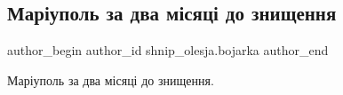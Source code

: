  
 
 
 
 

\subsection{Маріуполь за два місяці до знищення}
\label{sec:02_12_2022.fb.shnip_olesja.bojarka.1.mar_upol_za_dva_m_sy}

\ifcmt
 author_begin
   author_id shnip_olesja.bojarka
 author_end
\fi

Маріуполь за два місяці до знищення.
